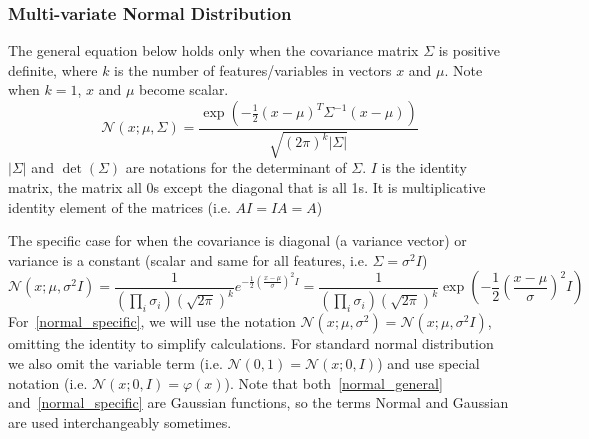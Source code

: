 \documentclass{book}
\numberwithin{equation}{subsection}
\begin{document}
\subsubsection{Multi-variate Normal Distribution}
\label{normal_dist}
The general equation below holds only when the covariance matrix $\Sigma$ is positive definite, where $k$ is the number of features/variables in vectors $x$ and $\mu$. Note when $k=1$, $x$ and $\mu$ become scalar.
\begin{equation}
    \mathcal{N}(x; \mu, \Sigma)=\frac {\exp \left(-{\frac {1}{2}}\left(x-\mu\right)^T\Sigma^{-1}\left(x-\mu\right)\right)}{\sqrt {(2\pi )^{k}|\Sigma|}}
    \label{normal_general}
\end{equation}
$|\Sigma|$ and $\det(\Sigma)$ are notations for the determinant of $\Sigma$. $I$ is the identity matrix, the matrix all 0s except the diagonal that is all 1s. It is multiplicative identity element of the matrices (i.e. $AI = IA = A$)

The specific case for when the covariance is diagonal (a variance vector) or variance is a constant (scalar and same for all features, i.e. $\Sigma = \sigma^2 I$)
\begin{equation}
    \mathcal{N}(x; \mu, \sigma^2I) = \frac {1}{(\prod_i \sigma_i)(\sqrt{2\pi})^k} e^{-{\frac {1}{2}}\left(\frac {x-\mu}{\sigma}\right)^2 I} = \frac {1}{(\prod_i \sigma_i)(\sqrt{2\pi})^k} \exp\left(-{\frac {1}{2}}\left(\frac {x-\mu}{\sigma}\right)^2 I\right) \label{normal_specific}
\end{equation}
For~\ref{normal_specific}, we will use the notation $\mathcal{N}(x; \mu, \sigma^2) = \mathcal{N}(x; \mu, \sigma^2I)$, omitting the identity to simplify calculations. For standard normal distribution we also omit the variable term (i.e. $\mathcal{N}(0, 1)=\mathcal{N}(x; 0, I)$) and use special notation (i.e. $\mathcal{N}(x; 0, I)=\mathcal{\varphi}(x)$). Note that both~\ref{normal_general} and~\ref{normal_specific} are Gaussian functions, so the terms Normal and Gaussian are used interchangeably sometimes.
\end{document}
